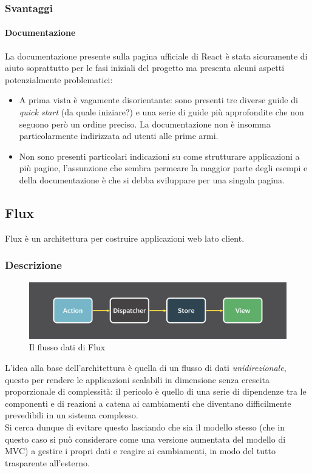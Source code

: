 \subsubsection{Svantaggi}

\paragraph{Documentazione}
La documentazione presente sulla pagina ufficiale di React è stata sicuramente di aiuto
soprattutto per le fasi iniziali del progetto ma presenta alcuni aspetti potenzialmente
problematici:

\begin{itemize}
\item A prima vista è vagamente disorientante: sono presenti tre diverse guide di
\textit{quick start} (da quale iniziare?) e una serie di guide più approfondite che
non seguono però un ordine preciso. La documentazione non è insomma particolarmente
indirizzata ad utenti alle prime armi.
\item Non sono presenti particolari indicazioni su come strutturare applicazioni
a più pagine, l'assunzione che sembra permeare la maggior parte degli esempi e della
documentazione è che si debba sviluppare per una singola pagina.
\end{itemize}

\subsection{Flux}\label{flux}

Flux è un architettura per costruire applicazioni web lato client.

\subsubsection{Descrizione}

\begin{figure}[H]\label{imgFluxDataFlow}
	\centering
	\includegraphics[width=1\columnwidth]{images/flux-data-flow.png}
	\caption{Il flusso dati di Flux}
\end{figure}

L'idea alla base dell'architettura è quella di un flusso di dati \textit{unidirezionale},
questo per rendere le applicazioni scalabili in dimensione senza crescita proporzionale
di complessità: il pericolo è quello di una serie di dipendenze tra le componenti e di reazioni
a catena ai cambiamenti che diventano difficilmente prevedibili in un sistema complesso. \\
Si cerca dunque di evitare questo lasciando che sia il modello stesso (che in questo caso
si può considerare come una versione aumentata del modello di MVC) a gestire i propri dati
e reagire ai cambiamenti, in modo del tutto trasparente all'esterno. \\

